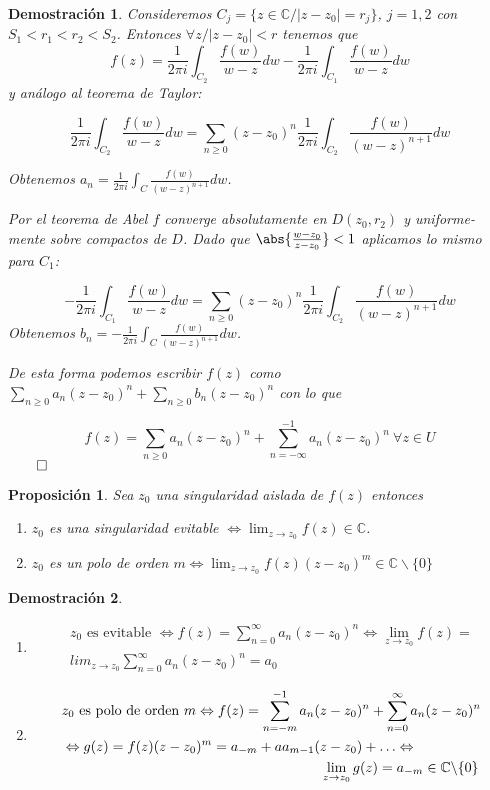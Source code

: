 \documentclass[12pt]{book}
\newtheorem{prop}{Proposición}[chapter]
\newtheorem*{dem}{Demostración}
\newcommand{\C}{\mathbb{C}}
\begin{document}
\begin{dem}
Consideremos $C_j = \{z\in\C / |z-z_0| = r_j\}$, $j= 1,2$ con $S_1 < r_1 < r_2 <S_2$.
Entonces $\forall z / |z-z_0|<r$ tenemos 	que 
$$f(z) = \frac{1}{2\pi i} \int_{C_2} \frac{f(w)}{w-z}dw - \frac{1}{2\pi i} \int_{C_1} \frac{f(w)}{w-z}dw$$
y análogo al teorema de Taylor:

$$\frac{1}{2\pi i} \int_{C_2} \frac{f(w)}{w-z}dw = \sum_{n\geq 0}(z-z_0)^n \frac{1}{2\pi i} \int_{C_2} \frac{f(w)}{(w-z)^{n+1}}dw$$

Obtenemos $a_n = \frac{1}{2\pi i}\int_C \frac{f(w)}{(w-z)^{n+1}}dw$.

Por el teorema de Abel $f$ converge absolutamente en $D(z_0,r_2)$ y uniforme- mente sobre compactos de $D$. Dado que $\abs{\frac{w-z_0}{z-z_0}}<1$ aplicamos lo mismo para $C_1$:

$$-\frac{1}{2\pi i} \int_{C_1} \frac{f(w)}{w-z}dw = \sum_{n\geq 0}(z-z_0)^n \frac{1}{2\pi i} \int_{C_2} \frac{f(w)}{(w-z)^{n+1}}dw$$
Obtenemos $b_n = -\frac{1}{2\pi i}\int_C \frac{f(w)}{(w-z)^{n+1}}dw$.

De esta forma podemos escribir $f(z)$ como $\sum_{n\geq 0} a_n (z-z_0)^n +  \sum_{n\geq 0} b_n (z-z_0)^n$ con lo que 

$$f(z) = \sum_{n\geq 0} a_n (z-z_0)^n +  \sum_{n= -\infty}^{-1} a_n (z-z_0)^n\ \forall z\in U$$$\qed$
\end{dem}

\begin{prop}
Sea $z_0$ una singularidad aislada de $f(z)$ entonces 
\begin{enumerate}
\item $z_0$ es una singularidad evitable $\Leftrightarrow \lim_{z\to z_0} f(z) \in\C$.
\item $z_0$ es un polo de orden $m \Leftrightarrow \lim_{z\to z_0} f(z)(z-z_0)^m \in \C\backslash\{0\}$
\end{enumerate}
\end{prop}

\begin{dem}\ \\
\begin{enumerate}
\item \begin{align*}
	z_0 \text{ es evitable } \Leftrightarrow f(z) = \sum_{n=0}^{\infty} a_n (z-z_0)^n \Leftrightarrow \lim_{z\to z_0} f(z) = \\
	lim_{z\to z_0} \sum_{n=0}^\infty a_n (z-z_0)^n = a_0
	\end{align*}

\item \begin{align*}
&z_0 \text{ es polo de orden } m \Leftrightarrow f(z) = \sum_{n=-m}^{-1} a_n(z-z_0)^n + \sum_{n=0}^\infty a_n (z-z_0)^n\\
&\Leftrightarrow g(z) = f(z)(z-z_0)^m = a_{-m} + aa_{m-1}(z-z_0)+\ldots \Leftrightarrow\\
&\hspace{6.5cm} \lim_{z\to z_0} g(z) = a_{-m}\in \C\backslash\{0\}
\end{align*}
\end{enumerate}
\end{dem}
\end{document}
